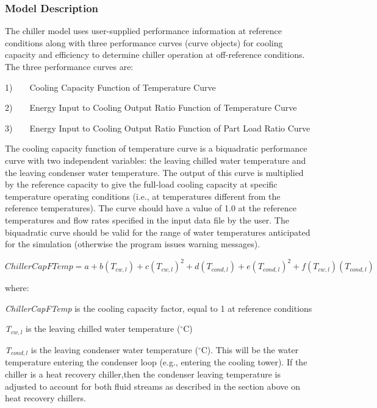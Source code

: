 \subsubsection{Model Description}\label{model-description-3-002}

The chiller model uses user-supplied performance information at reference conditions along with three performance curves (curve objects) for cooling capacity and efficiency to determine chiller operation at off-reference conditions. The three performance curves are:

1)~~~~Cooling Capacity Function of Temperature Curve

2)~~~~Energy Input to Cooling Output Ratio Function of Temperature Curve

3)~~~~Energy Input to Cooling Output Ratio Function of Part Load Ratio Curve

The cooling capacity function of temperature curve is a biquadratic performance curve with two independent variables: the leaving chilled water temperature and the leaving condenser water temperature. The output of this curve is multiplied by the reference capacity to give the full-load cooling capacity at specific temperature operating conditions (i.e., at temperatures different from the reference temperatures). The curve should have a value of 1.0 at the reference temperatures and flow rates specified in the input data file by the user. The biquadratic curve should be valid for the range of water temperatures anticipated for the simulation (otherwise the program issues warning messages).

\begin{equation}
ChillerCapFTemp = a + b({T_{cw,l}}) + c{({T_{cw,l}})^2} + d({T_{cond,l}}) + e{({T_{cond,l}})^2} + f({T_{cw,l}})({T_{cond,l}})
\end{equation}

where:

\emph{ChillerCapFTemp} is the cooling capacity factor, equal to 1 at reference conditions

\emph{T\(_{cw,l}\)} is the leaving chilled water temperature (\(^{\circ}\)C)

\emph{T\(_{cond,l}\)} is the leaving condenser water temperature (\(^{\circ}\)C). This will be the water temperature entering the condenser loop (e.g., entering the cooling tower). If the chiller is a heat recovery chiller,then the condenser leaving temperature is adjusted to account for both fluid streams as described in the section above on heat recovery chillers.

